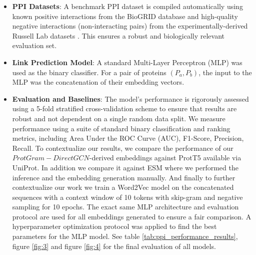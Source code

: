 \documentclass[utf8]{FrontiersinHarvard}
\begin{document}
\begin{itemize}
\begin{itemize}
			\item The final weights $alpha_i$ come from applying Softmax to the raw scores. This step normalizes scores into a probability distribution: $\alpha_i = \frac{\exp(s_i)}{\sum_{j=1}^{n} \exp(s_j)}$.
			
			\item We next compute the weighted average of the n-gram embeddings using the attention weights. This produces the final, attention-pooled per-protein embedding vector. The final per-protein embeddings is the weighted sum of the n-gram vectors, each scaled by its attention weight: $\mathbf{v}_{\text{protein}} = \sum_{i=1}^{n} \alpha_i \mathbf{v}_i$.
			
			\item This final vector, $\mathbf{v}_{\text{protein}}$, represents the protein, reflecting the contribution of its most important n-grams as determined by self-attention.
		\end{itemize}
		
		
		\item \textbf{PPI Datasets}: A benchmark PPI dataset is compiled automatically using known positive interactions from the BioGRID database \cite{oughtred_biogriddatabasecomprehensive_2021} and high-quality negative interactions (non-interacting pairs) from the experimentally-derived Russell Lab datasets \cite{trabuco_negativeproteinprotein_2012}. This ensures a robust and biologically relevant evaluation set.
		
		\item \textbf{Link Prediction Model}: A standard Multi-Layer Perceptron (MLP) was used as the binary classifier. For a pair of proteins $(P_a, P_b)$, the input to the MLP was the concatenation of their embedding vectors.
		
		\item \textbf{Evaluation and Baselines}: The model's performance is rigorously assessed using a 5-fold stratified cross-validation scheme to ensure that results are robust and not dependent on a single random data split. We measure performance using a suite of standard binary classification and ranking metrics, including Area Under the ROC Curve (AUC), F1-Score, Precision, Recall. To contextualize our results, we compare the performance of our $ProtGram-DirectGCN$-derived embeddings against ProtT5 \cite{elnaggar_prottransunderstandinglanguage_2022} available via UniProt. In addition we compare it against ESM \cite{rao_transformerproteinlanguage_2020} where we performed the inference and the embedding generation manually. And finally to further contextualize our work we train a Word2Vec model \cite{mikolov_distributedrepresentationswords_2013} on the concatenated sequences with a context window of 10 tokens with skip-gram and negative sampling for 10 epochs. The exact same MLP architecture and evaluation protocol are used for all embeddings generated to ensure a fair comparison. A hyperparameter optimization protocol was applied to find the best parameters for the MLP model. See table \ref{tab:ppi_performance_results}, figure \ref{fig:3} and figure \ref{fig:4} for the final evaluation of all models.
	\end{itemize}
	
\end{document}
